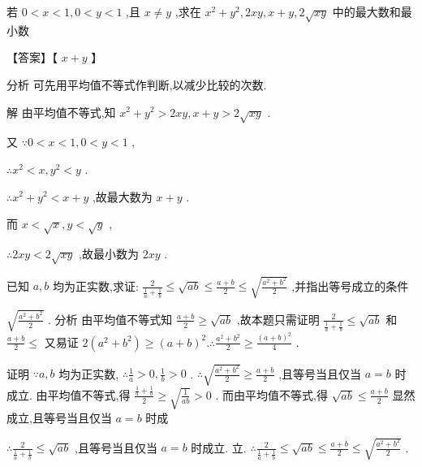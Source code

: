 \documentclass[11pt,a4paper]{article}
\begin{document}
\begin{problem} 
若 \(\displaystyle 0 < x < 1,0 < y < 1\) ,且 \(\displaystyle x \neq  y\) ,求在 \(\displaystyle {x}^{2} + {y}^{2},{2xy},x + y,2\sqrt{xy}\) 中的最大数和最小数
\begin{jiexi}[25]
【答案】【 \(\displaystyle x + y\) 】

分析 可先用平均值不等式作判断,以减少比较的次数.

解 由平均值不等式,知 \(\displaystyle {x}^{2} + {y}^{2} > {2xy},x + y > 2\sqrt{xy}\) .

又 \(\displaystyle \because 0 < x < 1,0 < y < 1\) ,

\(\displaystyle \therefore {x}^{2} < x,{y}^{2} < y\) .

\(\displaystyle \therefore {x}^{2} + {y}^{2} < x + y\) ,故最大数为 \(\displaystyle x + y\) .

而 \(\displaystyle x < \sqrt{x},y < \sqrt{y}\) ,

\(\displaystyle \therefore {2xy} < 2\sqrt{xy}\) ,故最小数为 \(\displaystyle {2xy}\) .


\end{jiexi}
\end{problem}
\begin{problem} 
已知 \(\displaystyle a,b\) 均为正实数,求证: \(\displaystyle \frac{2}{\frac{1}{a} + \frac{1}{b}} \leq  \sqrt{ab} \leq  \frac{a + b}{2} \leq  \sqrt{\frac{{a}^{2} + {b}^{2}}{2}}\) ,并指出等号成立的条件
\begin{jiexi}[25]
\(\displaystyle \sqrt{\frac{{a}^{2} + {b}^{2}}{2}}\) . 分析 由平均值不等式知 \(\displaystyle \frac{a + b}{2} \geq  \sqrt{ab}\) ,故本题只需证明 \(\displaystyle \frac{2}{\frac{1}{a} + \frac{1}{b}} \leq  \sqrt{ab}\) 和 \(\displaystyle \frac{a + b}{2} \leq\) 又易证 \(\displaystyle 2\left( {{a}^{2} + {b}^{2}}\right)  \geq  {\left( a + b\right) }^{2}.\therefore \frac{{a}^{2} + {b}^{2}}{2} \geq  \frac{{\left( a + b\right) }^{2}}{4}\) .

证明 \(\displaystyle \because a,b\) 均为正实数, \(\displaystyle \therefore \frac{1}{a} > 0,\frac{1}{b} > 0\) . \(\displaystyle \therefore \sqrt{\frac{{a}^{2} + {b}^{2}}{2}} \geq  \frac{a + b}{2}\) ,且等号当且仅当 \(\displaystyle a = b\) 时成立. 由平均值不等式,得 \(\displaystyle \frac{\frac{1}{a} + \frac{1}{b}}{2} \geq  \sqrt{\frac{1}{ab}} > 0\) . 而由平均值不等式,得 \(\displaystyle \sqrt{ab} \leq  \frac{a + b}{2}\) 显然成立,且等号当且仅当 \(\displaystyle a = b\) 时成

\(\displaystyle \therefore \frac{2}{\frac{1}{a} + \frac{1}{b}} \leq  \sqrt{ab}\) ,且等号当且仅当 \(\displaystyle a = b\) 时成立. 立. \(\displaystyle \therefore \frac{2}{\frac{1}{a} + \frac{1}{b}} \leq  \sqrt{ab} \leq  \frac{a + b}{2} \leq  \sqrt{\frac{{a}^{2} + {b}^{2}}{2}}\) .


\end{jiexi}
\end{problem}
\end{document}
